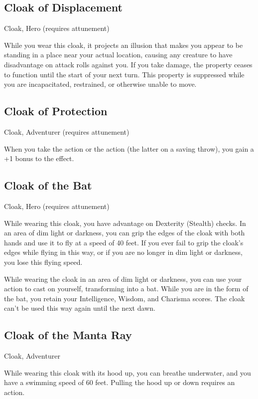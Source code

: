 \subsection{Cloak of Displacement}
Cloak, Hero (requires attunement) 

While you wear this cloak, it projects an illusion that makes you appear to be standing in a place near your actual location, causing any creature to have disadvantage on attack rolls against you. If you take damage, the property ceases to function until the start of your next turn. This property is suppressed while you are incapacitated, restrained, or otherwise unable to move.

\subsection{Cloak of Protection}
Cloak, Adventurer (requires attunement)

When you take the  action or the  action (the latter on a saving throw), you gain a +1 bonus to the effect.

\subsection{Cloak of the Bat}
Cloak, Hero (requires attunement)

While wearing this cloak, you have advantage on Dexterity (Stealth) checks. In an area of dim light or darkness, you can grip the edges of the cloak with both hands and use it to fly at a speed of 40 feet. If you ever fail to grip the cloak's edges while flying in this way, or if you are no longer in dim light or darkness, you lose this flying speed.

While wearing the cloak in an area of dim light or darkness, you can use your action to cast  on yourself, transforming into a bat. While you are in the form of the bat, you retain your Intelligence, Wisdom, and Charisma scores. The cloak can't be used this way again until the next dawn.

\subsection{Cloak of the Manta Ray}
Cloak, Adventurer

While wearing this cloak with its hood up, you can breathe underwater, and you have a swimming speed of 60 feet. Pulling the hood up or down requires an action.

